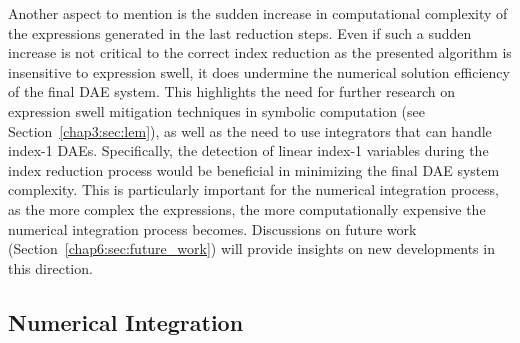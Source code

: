 Another aspect to mention is the sudden increase in computational complexity of the expressions generated in the last reduction steps. Even if such a sudden increase is not critical to the correct index reduction as the presented algorithm is insensitive to expression swell, it does undermine the numerical solution efficiency of the final \ac{DAE} system. This highlights the need for further research on expression swell mitigation techniques in symbolic computation (see Section~\ref{chap3:sec:lem}), as well as the need to use integrators that can handle index-1 \acp{DAE}. Specifically, the detection of linear index-1 variables during the index reduction process would be beneficial in minimizing the final \ac{DAE} system complexity. This is particularly important for the numerical integration process, as the more complex the expressions, the more computationally expensive the numerical integration process becomes. Discussions on future work (Section~\ref{chap6:sec:future_work}) will provide insights on new developments in this direction.

\subsection{Numerical Integration}

